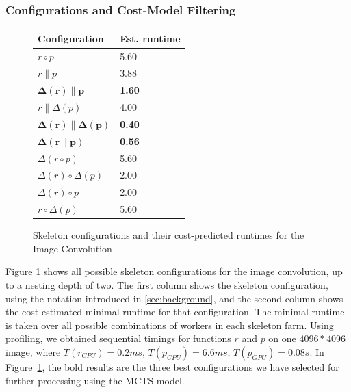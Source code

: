 \documentclass[smallextended]{svjour3}
\begin{document}
\subsubsection{Configurations and Cost-Model Filtering}
\begin{figure}[t]
\begin{center}
\begin{tabular}{| l | l |}
\hline
 Configuration & Est. runtime \tabularnewline
\hline
\hline
$ r \circ p $ & 5.60  \tabularnewline
\hline
$r \parallel p$ & 3.88 \tabularnewline
\hline
$ \mathbf{\Delta(r) \parallel p}$ & \textbf{1.60} \tabularnewline
\hline
$ r \parallel \Delta(p)$ & 4.00 \tabularnewline
\hline
$\mathbf{\Delta(r) \parallel \Delta(p)}$ & \textbf{0.40}  \tabularnewline
\hline
$\mathbf{\Delta(r \parallel p)}$ & \textbf{0.56}  \tabularnewline
\hline
$\Delta(r \circ p)$ & 5.60  \tabularnewline
\hline
$\Delta(r) \circ \Delta(p)$ & 2.00  \tabularnewline
\hline
$\Delta(r) \circ p$ & 2.00 \tabularnewline
\hline
$r \circ \Delta(p)$ & 5.60 \tabularnewline
\hline
\end{tabular}
\caption{Skeleton configurations and their cost-predicted runtimes for
  the Image Convolution}
\label{fig:configsConvolution}
\end{center}
\end{figure}
\noindent

Figure \ref{fig:configsConvolution}  shows all possible
skeleton configurations for the image convolution, up to a nesting depth of two. The first column shows the skeleton configuration, using the
notation introduced in \ref{sec:background}, and the second column shows the
cost-estimated minimal runtime for that configuration. 
The minimal runtime is taken over all possible combinations of workers in each skeleton farm.
Using profiling, we obtained
sequential timings for functions $r$ and $p$ on one $4096*4096$ image, where
$T(r_{CPU})=0.2ms$, $T(p_{CPU})=6.6ms$, $T(p_{GPU})=0.08s$.
In Figure~\ref{fig:configsConvolution}, the bold results are the three best configurations we have selected for further
processing using the MCTS model.


\end{document}
